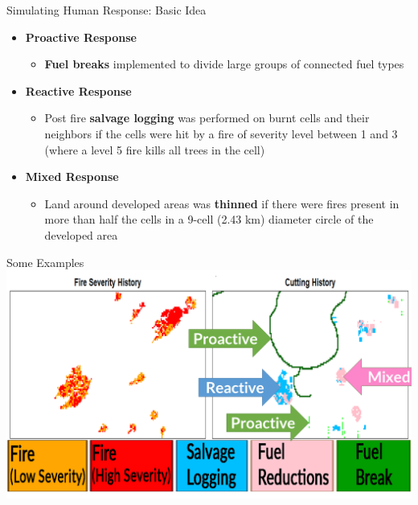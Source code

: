 \documentclass[xcolor=dvipsnames]{beamer}
\begin{document}
\begin{frame}{Simulating Human Response: Basic Idea}
\begin{itemize}
\item[] \textbf{\color{fuelBreakColor}Proactive Response }
\begin{itemize}
\item	\textbf{Fuel breaks} implemented to divide large groups of connected fuel types 
\end{itemize}
\vspace*{.25cm}
\item[] \textbf{\color{salvageLogColor}Reactive Response}
\begin{itemize}
\item	Post fire \textbf{salvage logging} was performed on burnt cells and their neighbors if the cells were hit by a fire of severity level between 1 and 3 (where a level 5 fire kills all trees in the cell)
\end{itemize}
\vspace*{.25cm}
\item[] \textbf{\color{fuelReductionColor}Mixed Response }
\begin{itemize}
\item	Land around developed areas was \textbf{thinned} if there were fires present in more than half the cells in a 9-cell (2.43 km) diameter circle of the developed area
\end{itemize}
\end{itemize}
\end{frame}


\begin{frame}{Some Examples}
\includegraphics[width=\linewidth]{ExampleCut.png}
\end{frame}
\end{document}
